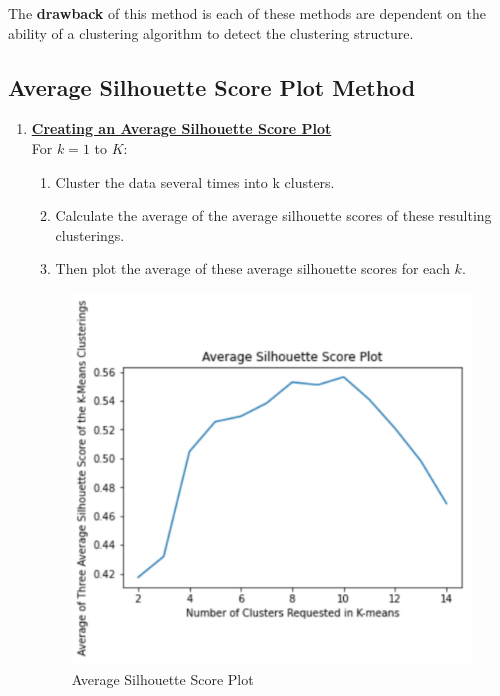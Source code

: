 \documentclass[11pt]{elegantbook}
\begin{document}
The \textbf{drawback} of this method is each of these methods are dependent on the ability of a clustering algorithm to detect the clustering structure.

\subsection{Average Silhouette Score Plot Method}
\begin{enumerate}[(1).]
    \item \textbf{\underline{Creating an Average Silhouette Score Plot}}\\
    For $k=1$ to $K$:
    \begin{enumerate}[$\bullet$]
        \item Cluster the data several times into k clusters.
        \item Calculate the average of the average silhouette scores of these resulting
        clusterings.
        \item Then plot the average of these average silhouette scores for each $k$.
    \end{enumerate}
    \begin{center}\begin{figure}[htbp]
        \centering
        \includegraphics[scale=0.2]{Average Silhouette Score Plot.png}
        \caption{Average Silhouette Score Plot}
        \label{}
    \end{figure}\end{center}

\end{enumerate}
\end{document}
